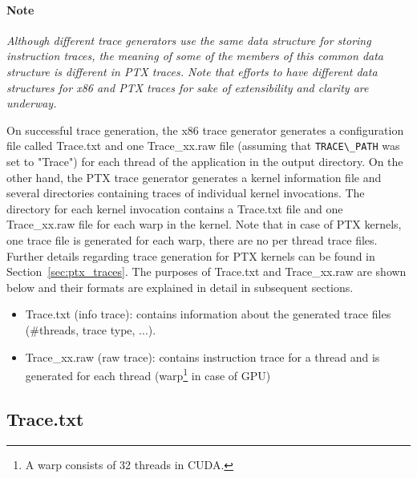 \paragraph{Note}

\textit{Although different trace generators use the same data structure for
storing instruction traces, the meaning of some of the members of this
common data structure is different in PTX traces. Note that efforts to
have different data structures for x86 and PTX traces for sake of
extensibility and clarity are underway.}


On successful trace generation, the x86 trace generator generates a
configuration file called Trace.txt and one Trace\_xx.raw file
(assuming that \Verb+TRACE\_PATH+ was set to "Trace") for each thread
of the application in the output directory. On the other hand, the PTX
trace generator generates a kernel information file and several
directories containing traces of individual kernel invocations. The
directory for each kernel invocation contains a Trace.txt file and one
Trace\_xx.raw file for each warp in the kernel.  Note that in case of
PTX kernels, one trace file is generated for each warp, there are no
per thread trace files. Further details regarding trace generation for
PTX kernels can be found in Section~\ref{sec:ptx_traces}. The purposes
of Trace.txt and Trace\_xx.raw are shown below and their formats are
explained in detail in subsequent sections.


\begin{itemize}\itemsep2pt
\item Trace.txt (info trace): contains information about the generated trace files (\#threads, trace type, ...).
\item Trace\_xx.raw (raw trace): contains instruction trace for a thread and is generated for each thread (warp\footnote{A warp consists of 32 threads in CUDA.} in case of GPU)
\end{itemize}



\subsection{Trace.txt}


